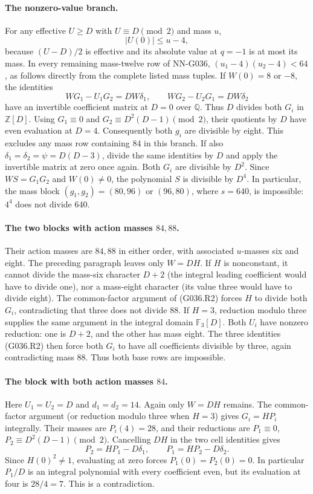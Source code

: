 \paragraph{The nonzero-value branch.}
For any effective $U\ge D$ with $U\equiv D\pmod2$ and mass $u$,
\[
 |U(0)|\le u-4,
\]
because $(U-D)/2$ is effective and its absolute value at $q=-1$
is at most its mass. In every remaining mass-twelve row of
NN-G036, $(u_1-4)(u_2-4)<64$, as follows directly from the
complete listed mass tuples. If $W(0)=8$ or $-8$, the identities
\[
 WG_1-U_1G_2=DW\delta_1,\qquad
 WG_2-U_2G_1=DW\delta_2
\]
have an invertible coefficient matrix at $D=0$ over $\mathbb Q$.
Thus $D$ divides both $G_i$ in $\mathbb Z[D]$.
Using $G_1\equiv0$ and $G_2\equiv D^2(D-1)\pmod2$, their
quotients by $D$ have even evaluation at $D=4$. Consequently
both $g_i$ are divisible by eight. This excludes any mass row
containing $84$ in this branch.
If also $\delta_1=\delta_2=\psi=D(D-3)$, divide the same
identities by $D$ and apply the invertible matrix at zero once
again. Both $G_i$ are divisible by $D^2$. Since $WS=G_1G_2$
and $W(0)\ne0$, the polynomial $S$ is divisible by $D^4$.
In particular, the mass block $(g_1,g_2)=(80,96)$ or $(96,80)$,
where $s=640$, is impossible: $4^4$ does not divide $640$.

\paragraph{The two blocks with action masses $84,88$.}
Their action masses are $84,88$ in either order, with associated
$u$-masses six and eight. The preceding paragraph leaves only
$W=DH$. If $H$ is nonconstant, it cannot divide the mass-six
character $D+2$ (the integral leading coefficient would have
to divide one), nor a mass-eight character (its value three
would have to divide eight). The common-factor argument of
(G036.R2) forces $H$ to divide both $G_i$, contradicting that
three does not divide $88$.
If $H=3$, reduction modulo three supplies the same argument
in the integral domain $\mathbb F_3[D]$. Both $U_i$ have
nonzero reduction: one is $D+2$, and the other has mass eight.
The three identities (G036.R2) then force both $G_i$ to have
all coefficients divisible by three, again contradicting
mass $88$. Thus both base rows are impossible.

\paragraph{The block with both action masses $84$.}
Here $U_1=U_2=D$ and $d_1=d_2=14$. Again only $W=DH$
remains. The common-factor argument (or reduction modulo
three when $H=3$) gives $G_i=HP_i$ integrally. Their masses
are $P_i(4)=28$, and their reductions are
$P_1\equiv0$, $P_2\equiv D^2(D-1)\pmod2$.
Cancelling $DH$ in the two cell identities gives
\[
 P_2=HP_1-D\delta_1,\qquad
 P_1=HP_2-D\delta_2.
\]
Since $H(0)^2\ne1$, evaluating at zero forces
$P_1(0)=P_2(0)=0$. In particular $P_1/D$ is an integral
polynomial with every coefficient even, but its evaluation
at four is $28/4=7$. This is a contradiction.

